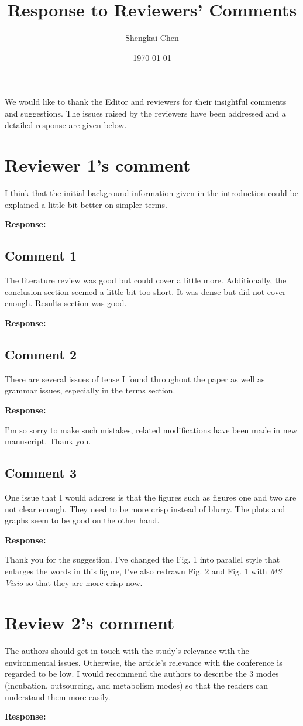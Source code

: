 \documentclass{article}
\author{Shengkai Chen}
\date{\today}
\title{Response to Reviewers' Comments}
\begin{document}
\maketitle

We would like to thank the Editor and reviewers for their insightful comments and suggestions. The issues raised by the reviewers have been addressed and a detailed response are given below.

\setlength\parindent{0pt}

\section*{Reviewer 1's comment}
I think that the initial background information given in the introduction could be explained a little bit better on simpler terms.

\textbf{Response:}


\subsection*{Comment 1} %
The literature review was good but could cover a little more. Additionally, the conclusion section seemed a little bit too short. It was dense but did not cover enough. Results section was good.

\textbf{Response:}
 

\subsection*{Comment 2} %
There are several issues of tense I found throughout the paper as well as grammar issues, especially in the terms section.

\textbf{Response:}

I'm so sorry to make such mistakes, related modifications have been made in new manuscript. Thank you.

\subsection*{Comment 3} %
One issue that I would address is that the figures such as figures one and two are not clear enough.  They need to be more crisp instead of blurry. The plots and graphs seem to be good on the other hand.

\textbf{Response:}

Thank you for the suggestion. I've changed the Fig. 1 into parallel style that enlarges the words in this figure, I've also redrawn Fig. 2 and Fig. 1 with \textit{MS Visio} so that they are more crisp now. 
\section*{Review 2's comment} %
The authors should get in touch with the study's relevance with the environmental issues. Otherwise, the article's relevance with the conference is regarded to be low.
I would recommend the authors to describe the 3 modes (incubation, outsourcing, and metabolism modes) so that the readers can understand them more easily.

\textbf{Response:}
\end{document}
